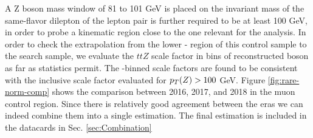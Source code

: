 A Z boson mass window of 81 to 101 GeV is placed on the invariant mass of the same-flavor dilepton \pt{} of the lepton pair is further required to be at least 100 GeV, in order to probe a kinematic region close to the one relevant for the analysis. In order to check the extrapolation from the lower \Z-\pt{} region of this control sample to the search sample, we evaluate the $ttZ$ scale factor in bins of reconstructed \Z{} boson \pt{} as far as statistics permit. The \pt-binned scale factors are found to be consistent with the inclusive scale factor evaluated for $p_{T}(Z)>100$ GeV. Figure \ref{fig:rare-norm-comp} shows the comparison between 2016, 2017, and 2018 in the muon control region. Since there is relatively good agreement between the eras we can indeed combine them into a single estimation. The final estimation is included in the datacards in Sec. \ref{sec:Combination}


